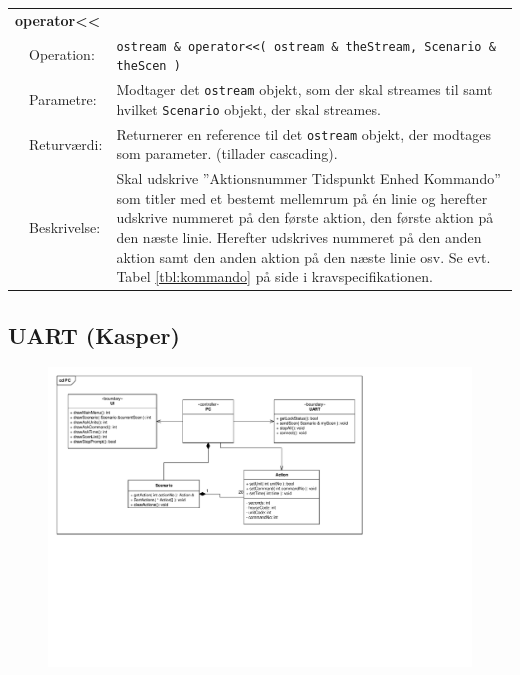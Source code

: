 \begin{table}[h]
\begin{tabularx}{\textwidth}{p{0.6 cm} l X} %
\multicolumn{3}{l}{\textbf{operator{<}{<}}}\\
& Operation: & 
\texttt{ostream \& operator{<}{<}( ostream \& theStream, Scenario \& theScen )}  
\\ & Parametre: & 
Modtager det \texttt{ostream} objekt, som der skal streames til samt hvilket \texttt{Scenario} objekt, der skal streames.
\\ & Returværdi: & 
Returnerer en reference til det \texttt{ostream} objekt, der modtages som parameter. (tillader cascading).
\\ & Beskrivelse: & 
Skal udskrive ''Aktionsnummer  Tidspunkt  Enhed  Kommando'' som titler med et bestemt mellemrum på én linie og herefter udskrive nummeret på den første aktion, den første aktion på den næste linie. Herefter udskrives nummeret på den anden aktion samt den anden aktion på den næste linie osv. Se evt. Tabel \ref{tbl:kommando} på side \pageref{tbl:kommando} i kravspecifikationen.
\\ \end{tabularx}
\end{table}

\clearpage

\subsection{UART (Kasper)}

\begin{figure}[h]
\centering
\includegraphics[scale=1,clip=true, trim=448 440 225 50]{Systemarkitektur/diagrammer/PC_KlasseDiagram} %
\end{figure}

